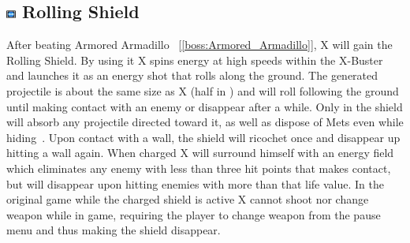 \subsection{\includegraphics[width=12px, height=10px]{figures/X1/weapons/Rolling_S.jpg} Rolling Shield}\label{Rolling_shield}
After beating Armored Armadillo ~[\ref{boss:Armored_Armadillo}], X will gain the Rolling Shield. By using it X spins energy at high speeds within the X-Buster and launches it as an energy shot that rolls along the ground. The generated projectile is about the same size as X (half in \mhx) and will roll following the ground until making contact with an enemy or disappear after a while. Only in \mhx the shield will absorb any projectile directed toward it, as well as dispose of Mets even while hiding~\cite{wiki:Rolling_shield}. Upon contact with a wall, the shield will ricochet once and disappear up hitting a wall again. When charged X will surround himself with an energy field which eliminates any enemy with less than three hit points that makes contact, but will disappear upon hitting enemies with more than that life value. In the original game while the charged shield is active X cannot shoot nor change weapon while in game, requiring the player to change weapon from the pause menu and thus making the shield disappear.
